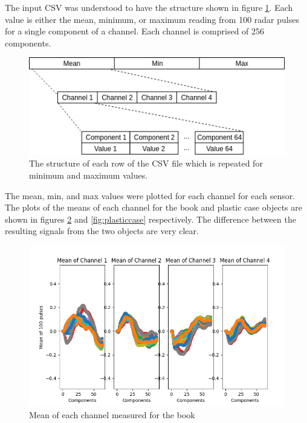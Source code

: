 \documentclass[12pt]{article}
\begin{document}
The input CSV was understood to have the structure shown in figure \ref{fig:structure}. Each value is either the mean, minimum, or maximum reading from 100 radar pulses for a single component of a channel. Each channel is comprised of 256 components.

\begin{figure}[!ht]
	\centering
	\includegraphics[width=\linewidth]{images/structure}
	\caption{The structure of each row of the CSV file which is repeated for minimum and maximum values.}
	\label{fig:structure}
\end{figure}

The mean, min, and max values were plotted for each channel for each sensor. The plots of the means of each channel for the book and plastic case objects are shown in figures \ref{fig:book} and \ref{fig:plasticcase} respectively. The difference between the resulting signals from the two objects are very clear.

\begin{figure}[!ht]
	\centering
	\includegraphics[width=\linewidth]{images/book}
	\caption{Mean of each channel measured for the book}
	\label{fig:book}
\end{figure}
\end{document}
